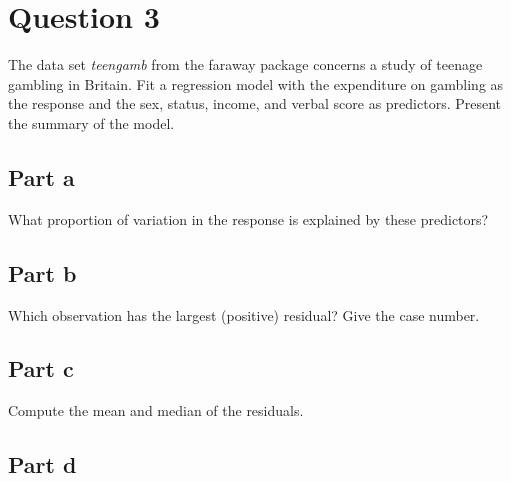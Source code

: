 \section{Question 3}

\begin{question}
    The data set \textit{teengamb} from the faraway package concerns a study of teenage gambling in Britain. Fit a regression model with the expenditure on gambling as the response and the sex, status, income, and verbal score as predictors. Present the summary of the
model.
\end{question}

\subsection{Part a}

\begin{question}
    What proportion of variation in the response is explained by these predictors?
\end{question}

\begin{answer}
    
\end{answer}

\subsection{Part b}

\begin{question}
    Which observation has the largest (positive) residual? Give the case number.
\end{question}

\begin{answer}
    
\end{answer}

\subsection{Part c}

\begin{question}
    Compute the mean and median of the residuals.
\end{question}

\begin{answer}
    
\end{answer}

\subsection{Part d}

